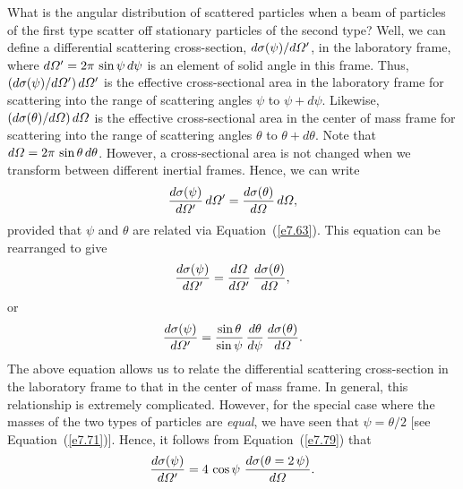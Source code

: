 What is the angular distribution of scattered particles when a beam
of particles of the first type  scatter off stationary particles of the second type?
Well, we can define a differential scattering cross-section, $d\sigma(\psi)/d{\mit\Omega}'$, in the
laboratory frame, where $d{\mit\Omega}'=2\pi\,\sin\psi\,d\psi$ is an element of solid angle in
this frame. Thus, $(d\sigma(\psi)/d{\mit\Omega}')\,d{\mit\Omega}'$
is the effective cross-sectional area in the laboratory  frame
for scattering into the range of scattering angles $\psi$ to $\psi+d\psi$.
Likewise, $(d\sigma(\theta)/d{\mit\Omega})\,d{\mit\Omega}$ is
the effective cross-sectional area in the center of mass frame for
scattering into the range of scattering angles $\theta$ to $\theta+d\theta$.
Note that $d{\mit\Omega} =2\pi\,\sin\theta\,d\theta$.
However, a cross-sectional area is not changed when we transform between
different inertial frames. Hence, we can write
\begin{equation}
\frac{d\sigma(\psi)}{d{\mit\Omega}'} \,d{\mit\Omega}' =
\frac{d\sigma(\theta)}{d{\mit\Omega}}\,d{\mit\Omega},
\end{equation}
provided that $\psi$ and $\theta$ are related via Equation~(\ref{e7.63}).
This equation can be rearranged to give
\begin{equation}
\frac{d\sigma(\psi)}{d{\mit\Omega}'} = \frac{d{\mit\Omega}}{d{\mit\Omega}'}\,\frac{d\sigma(\theta)}{d{\mit\Omega}},
\end{equation}
or
\begin{equation}\label{e7.79}
\frac{d\sigma(\psi)}{d{\mit\Omega}'} = \frac{\sin\theta}{\sin\psi}\,\frac{d\theta}{d\psi}\,\frac{d\sigma(\theta)}{d{\mit\Omega}}.
\end{equation}
The above equation allows us to relate the differential scattering cross-section
in the laboratory frame to that in the center of mass frame. In general, this
relationship is extremely complicated. However, for the special
case where the masses of the two types of particles are {\em equal}, we
have seen that $\psi=\theta/2$ [see Equation~(\ref{e7.71})]. Hence, it follows from Equation~(\ref{e7.79})
that
\begin{equation}\label{e7.80}
\frac{d\sigma(\psi)}{d{\mit\Omega}'} = 4\,\cos\psi\,\,\frac{d\sigma(\theta=2\,\psi)}{d{\mit\Omega}}.
\end{equation}

